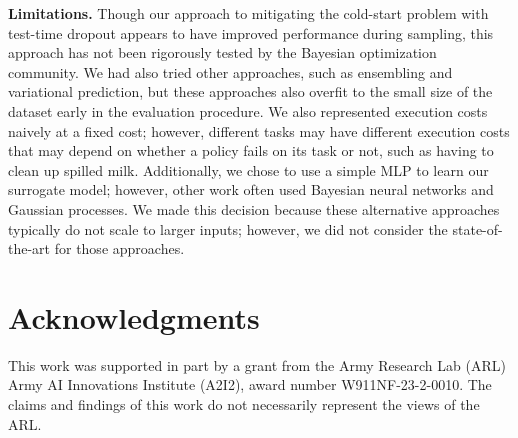 \textbf{Limitations.}
Though our approach to mitigating the cold-start problem with test-time dropout appears to have improved performance during sampling, this approach has not been rigorously tested by the Bayesian optimization community.
We had also tried other approaches, such as ensembling and variational prediction, but these approaches also overfit to the small size of the dataset early in the evaluation procedure.
We also represented execution costs naively at a fixed cost; however, different tasks may have different execution costs that may depend on whether a policy fails on its task or not, such as having to clean up spilled milk.
Additionally, we chose to use a simple MLP to learn our surrogate model; however, other work often used Bayesian neural networks and Gaussian processes. 
We made this decision because these alternative approaches typically do not scale to larger inputs; however, we did not consider the state-of-the-art for those approaches.

\section{Acknowledgments}
This work was supported in part by a grant from the Army Research Lab (ARL) Army AI Innovations Institute (A2I2), award number W911NF-23-2-0010.
The claims and findings of this work do not necessarily represent the views of the ARL.





